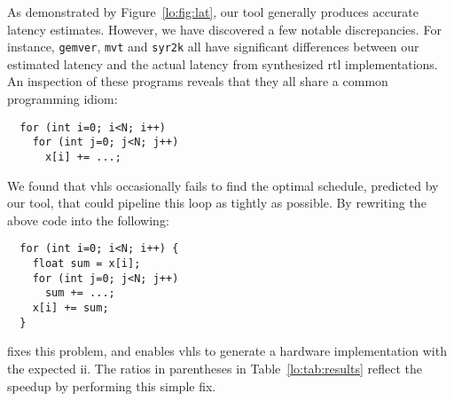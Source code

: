 As demonstrated by Figure~\ref{lo:fig:lat}, our tool generally produces
accurate latency estimates. However, we have discovered a few notable
discrepancies. For instance, \verb|gemver|, \verb|mvt| and \verb|syr2k| all
have significant differences between our estimated latency and the actual
latency from synthesized \gls{rtl} implementations.  An inspection of these
programs reveals that they all share a common programming idiom:
%
\begin{lstlisting}
  for (int i=0; i<N; i++)
    for (int j=0; j<N; j++)
      x[i] += ...;
\end{lstlisting}
%
We found that \gls{vhls} occasionally fails to find the optimal schedule,
predicted by our tool, that could pipeline this loop as tightly as possible.
By rewriting the above code into the following:
%
\begin{lstlisting}
  for (int i=0; i<N; i++) {
    float sum = x[i];
    for (int j=0; j<N; j++)
      sum += ...;
    x[i] += sum;
  }
\end{lstlisting}
%
fixes this problem, and enables \gls{vhls} to generate a hardware
implementation with the expected \gls{ii}. The ratios in parentheses in
Table~\ref{lo:tab:results} reflect the speedup by performing this simple fix.

